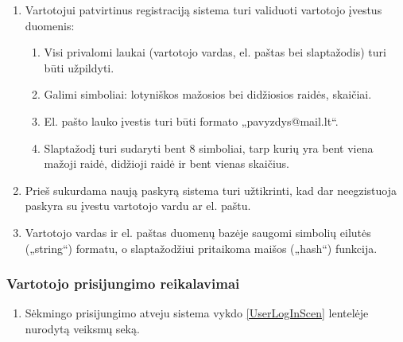 \documentclass[12pt]{article}
\renewcommand{\thesubsection}{FR\arabic{subsection}}
\renewcommand*{\theenumi}{\thesubsection.\arabic{enumi}}
\begin{document}
	\begin{enumerate}[resume, labelindent=10pt,leftmargin=2.2cm]
		\item\label{Validation} Vartotojui patvirtinus registraciją sistema turi validuoti vartotojo įvestus duomenis:
		
		\begin{enumerate}[label=\theenumi.\arabic{enumii}]
			\item Visi privalomi laukai (vartotojo vardas, el. paštas bei slaptažodis) turi būti užpildyti.
			\item Galimi simboliai: lotyniškos mažosios bei didžiosios raidės, skaičiai.
			\item El. pašto lauko įvestis turi būti formato „pavyzdys@mail.lt“.
			\item Slaptažodį turi sudaryti bent 8 simboliai, tarp kurių yra bent viena mažoji raidė, didžioji raidė ir bent vienas skaičius.
		\end{enumerate}	
		
		\item Prieš sukurdama naują paskyrą sistema turi užtikrinti, kad dar neegzistuoja paskyra su įvestu vartotojo vardu ar el. paštu.
		\item Vartotojo vardas ir el. paštas duomenų bazėje saugomi simbolių eilutės („string“) formatu, o slaptažodžiui pritaikoma maišos („hash“) funkcija.
	\end{enumerate}	
	\pagebreak
	
	\subsubsection{Vartotojo prisijungimo reikalavimai\label{LogInLabel}}
	\begin{enumerate}[labelindent=10pt,leftmargin=2.2cm]
		\item Sėkmingo prisijungimo atveju sistema vykdo \ref{UserLogInScen} lentelėje nurodytą veiksmų seką.
	\end{enumerate}
		
\end{document}
